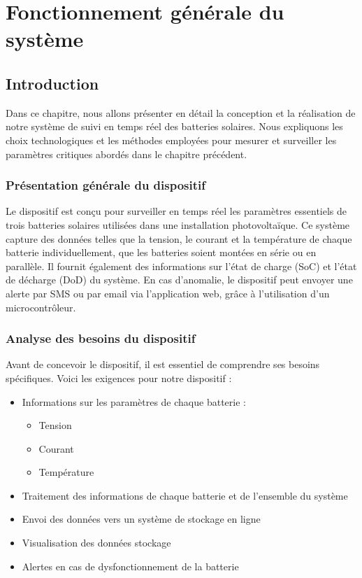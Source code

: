 \chapter{Fonctionnement générale du système }
{} 

\section{Introduction}

Dans ce chapitre, nous allons présenter en détail la conception et la réalisation de notre système de suivi en temps réel des batteries solaires. Nous expliquons les choix technologiques et les méthodes employées pour mesurer et surveiller les paramètres critiques abordés dans le chapitre précédent.

\subsection{Présentation générale du dispositif} Le dispositif est conçu pour surveiller en temps réel les paramètres essentiels de trois batteries solaires utilisées dans une installation photovoltaïque. Ce système capture des données telles que la tension, le courant et la température de chaque batterie individuellement, que les batteries soient montées en série ou en parallèle. Il fournit également des informations sur l'état de charge (SoC) et l'état de décharge (DoD) du système. En cas d'anomalie, le dispositif peut envoyer une alerte par SMS ou par email via l'application web, grâce à l'utilisation d'un microcontrôleur.

\subsection{Analyse des besoins du dispositif} 
Avant de concevoir le dispositif, il est essentiel de comprendre ses besoins spécifiques. Voici les exigences pour notre dispositif :

\begin{itemize} 
	\item Informations sur les paramètres de chaque batterie : 
	\begin{itemize} 
		\item Tension 
		\item Courant 
		\item Température 
	\end{itemize}
	\item Traitement des informations de chaque batterie et de l'ensemble du système 
	\item Envoi des données vers un système de stockage en ligne 
	\item Visualisation des données stockage 
	\item Alertes en cas de dysfonctionnement de la batterie 

\end{itemize}


